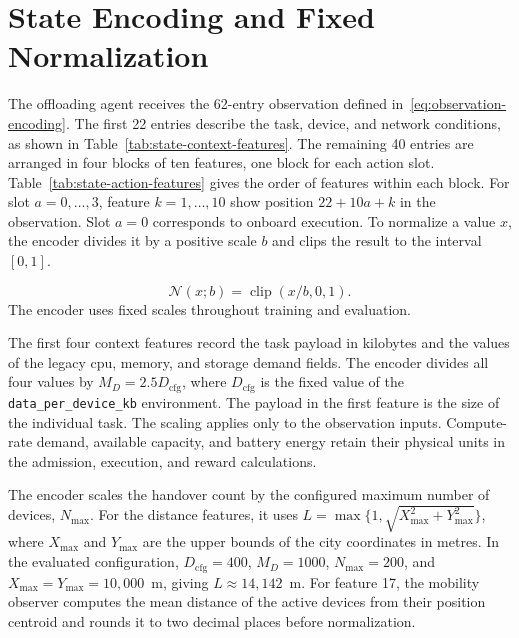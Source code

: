 \clearpage
\onecolumn
\appendices
\renewcommand{\theequation}{\Alph{section}.\arabic{equation}}
\renewcommand{\theHequation}{\Alph{section}.\arabic{equation}}
\setcounter{section}{0}
\setcounter{equation}{0}
\setcounter{table}{0}
\renewcommand*{\theHtable}{appendix.\arabic{table}}

\section{State Encoding and Fixed Normalization}
\label{sec:appendix-state-encoding}

The offloading agent receives the 62-entry observation defined in~\eqref{eq:observation-encoding}.
The first 22 entries describe the task, device, and network conditions, as shown in Table~\ref{tab:state-context-features}.
The remaining 40 entries are arranged in four blocks of ten features, one block for each action slot.
Table~\ref{tab:state-action-features} gives the order of features within each block.
For slot \(a=0,\ldots,3\), feature \(k=1,\ldots,10\) show position \(22+10a+k\) in the observation.
Slot \(a=0\) corresponds to onboard execution.
%
To normalize a value \(x\), the encoder divides it by a positive scale \(b\) and clips the result to the interval \([0,1]\).

\begin{equation}
\mathcal N(x;b)=\operatorname{clip}(x/b,0,1).
\label{eq:appendix-fixed-normalization}
\end{equation}
The encoder uses fixed scales throughout training and evaluation.

The first four context features record the task payload in kilobytes and the values of the legacy \acs{cpu}, memory, and storage demand fields.
The encoder divides all four values by \(M_D=2.5D_{\mathrm{cfg}}\), where \(D_{\mathrm{cfg}}\) is the fixed value of the \texttt{data\_per\_device\_kb} environment.
The payload in the first feature is the size of the individual task.
The scaling applies only to the observation inputs.
Compute-rate demand, available capacity, and battery energy retain their physical units in the admission, execution, and reward calculations.

The encoder scales the handover count by the configured maximum number of devices, \(N_{\max}\).
For the distance features, it uses \(L=\max\{1,\sqrt{X_{\max}^2+Y_{\max}^2}\}\), where \(X_{\max}\) and \(Y_{\max}\) are the upper bounds of the city coordinates in metres.
In the evaluated configuration, \(D_{\mathrm{cfg}}=400\), \(M_D=1000\), \(N_{\max}=200\), and \(X_{\max}=Y_{\max}=10{,}000\)~m, giving \(L\approx14{,}142\)~m.
For feature 17, the mobility observer computes the mean distance of the active devices from their position centroid and rounds it to two decimal places before normalization.

